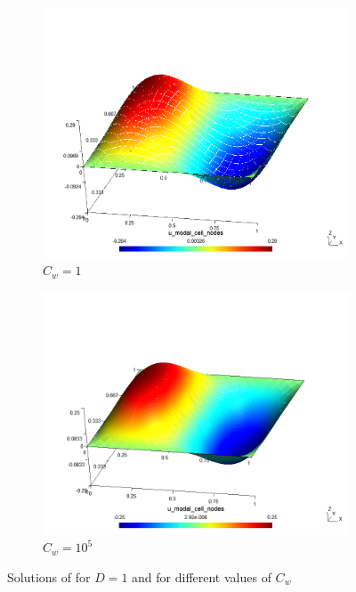 \begin{example}
\begin{figure}[h!]
	\centering
	\begin{subfigure}{.5\textwidth}	
		\centering	
		\includegraphics[width=\linewidth]{../figs/sols/quart1_0_3_1_0_0-h1024o04.png}
		\caption{$C_w = 1$}
	\end{subfigure}%
	\begin{subfigure}{.5\textwidth}
		\centering	
		\includegraphics[width=\linewidth]{../figs/sols/quart1_5_3_1_0_0-h1024o04.png}
		\caption{$C_w = 10^5$}
	\end{subfigure}
	\caption{Solutions of  for $D = 1$ and for different values of $C_w$}
	\label{fig:sol_quart1}
\end{figure}

\end{example}
